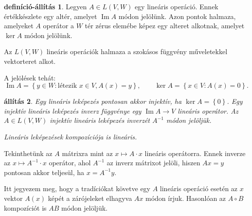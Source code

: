 \documentclass[9pt, a4paper, showtrims]{memoir}
\theoremstyle{plain}
\newtheorem{proposition}{állítás}[chapter]
\theoremstyle{remark}
\theoremstyle{definition}
\newtheorem{defprop}[proposition]{definíció-állítás}
\DeclareMathOperator{\im}{Im}
\begin{document}
\begin{defprop}
    Legyen $A\in L\left( V,W \right)$ egy lineáris operáció.
    Ennek értékkészlete egy altér, 
    amelyet $\im A$ módon jelölünk.
    Azon pontok halmaza, 
    amelyeket $A$ operátor a $W$ tér zérus elemébe képez egy alteret alkotnak,
    amelyet $\ker A$ módon jelölünk.

    Az $L\left( V,W \right)$ lineáris operációk halmaza a szokásos függvény műveletekkel vektorteret alkot.
\end{defprop}
A jelölések tehát:
\[
    \im A=\left\{ y\in W:\text{létezik } x\in V, A(x)=y \right\},
    \qquad
    \ker A=
    \left\{ x\in V:A\left( x \right)=0 \right\}.
\]
\begin{proposition}
    Egy lineáris leképezés pontosan akkor injektív, ha $\ker A=\left\{ 0 \right\}$.
    Egy injektív lineáris leképezés inverz függvénye egy $\im A\to V$ lineáris operátor.
    Az $A\in L\left( V,W \right)$ injektív lineáris leképezés inverzét $A^{-1}$ módon jelöljük.

    Lineáris leképezések kompozíciója is lineáris.
\end{proposition}
Tekinthetünk az $A$ mátrixra mint az $x\mapsto A\cdot x$ lineáris operátorra.
Ennek inverze az $x\mapsto A^{-1}\cdot x$ operátor,
ahol $A^{-1}$ az inverz mátrixot jelöli, hiszen
$Ax=y$ pontosan akkor teljesül, ha $x=A^{-1}y$.

Itt jegyezem meg, hogy a tradíciókat követve egy $A$ lineáris operáció esetén az $x$ vektor
$A\left( x \right)$ képét a zárójeleket elhagyva $Ax$ módon írjuk.
Hasonlóan az $A\circ B$ kompozíciót is $AB$ módon jelöljük.
\end{document}
